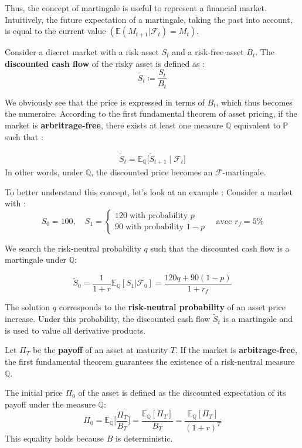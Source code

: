 \bigskip

Thus, the concept of martingale is useful to represent a financial market.
Intuitively, the future expectation of a martingale, taking the past into account, is equal to the current value $(\mathbb{E}(M_{t+1}|\mathcal{F}_t) = M_t)$.
 
Consider a discret market with a risk asset $S_t$ and a risk-free asset $B_t$.
The \textbf{discounted cash flow} of the risky asset is defined as : 
$$\tilde{S}_t \coloneq \frac{S_t}{B_t}$$
\cite{IntroductionALevaluationDoptions}

We obviously see that the price is expressed in terms of $B_t$, which thus becomes the numeraire.
According to the first fundamental theorem of asset pricing, if the market is \textbf{arbritrage-free}, there exists at least one measure $\mathbb{Q}$ equivalent to $\mathbb{P}$ such that : 

\begin{align*}
    \tilde{S}_t = \mathbb{E}_{\mathbb{Q}}\big[\tilde{S}_{t+1} \mid \mathcal{F}_t]
\end{align*}
In other words, under $\mathbb{Q}$, the discounted price becomes an $\mathcal{F}$-martingale.

To better understand this concept, let's look at an example : 
Consider a market with : 
$$
S_0 = 100, \quad S_1 = 
\begin{cases}
120 \; \text{with probability $p$} \\
90 \; \text{with probability $1-p$} \end{cases} \quad \text{avec } r_f = 5\%
$$

We search the risk-neutral probability $q$ such that the discounted cash flow is a martingale under $\mathbb{Q}$:

$$\tilde{S}_0 = \frac{1}{1+r}\mathbb{E_Q}[S_1|\mathcal{F}_0] = \frac{120q + 90(1-p)}{1+r_f}$$

The solution $q$ corresponds to the \textbf{risk-neutral probability} of an asset price increase.
Under this probability, the discounted cash flow $\tilde{S}_t$ is a martingale and is used to value all derivative products.

  
Let $\Pi_T$ be the \textbf{payoff} of an asset at maturity $T$. 
If the market is \textbf{arbitrage-free}, the first fundamental theorem guarantees the existence of a risk-neutral measure $\mathbb{Q}$.

The initial price $\Pi_0$ of the asset is defined as the discounted expectation of its payoff under the measure $\mathbb{Q}$:
$$\Pi_0 = \mathbb{E}_{\mathbb{Q}}\Big[\frac{\Pi_T}{B_T}\Big] = \frac{\mathbb{E}_{\mathbb{Q}}[\Pi_T]}{B_T} = \frac{\mathbb{E}_{\mathbb{Q}}[\Pi_T]}{(1+r)^T}$$
This equality holds because $B$ is deterministic.


